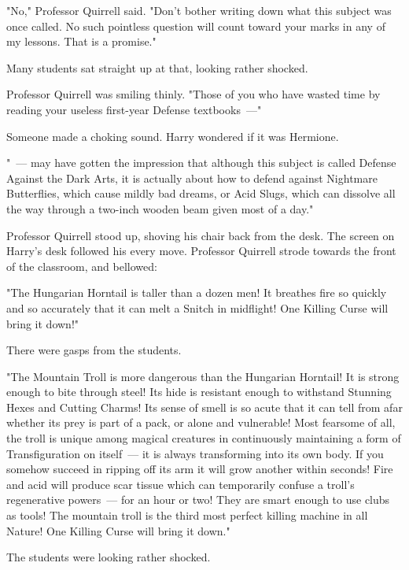"No," Professor Quirrell said. "Don't bother writing down what this subject was
once called. No such pointless question will count toward your marks in any of
my lessons. That is a promise."

Many students sat straight up at that, looking rather shocked.

Professor Quirrell was smiling thinly. "Those of you who have wasted time by
reading your useless first-year Defense textbooks~---"

Someone made a choking sound. Harry wondered if it was Hermione.

"~--- may have gotten the impression that although this subject is called Defense
Against the Dark Arts, it is actually about how to defend against Nightmare
Butterflies, which cause mildly bad dreams, or Acid Slugs, which can dissolve
all the way through a two-inch wooden beam given most of a day."

Professor Quirrell stood up, shoving his chair back from the desk. The screen
on Harry's desk followed his every move. Professor Quirrell strode towards the
front of the classroom, and bellowed:

"The Hungarian Horntail is taller than a dozen men! It breathes fire so quickly
and so accurately that it can melt a Snitch in midflight! One Killing Curse
will bring it down!"

There were gasps from the students.

"The Mountain Troll is more dangerous than the Hungarian Horntail! It is strong
enough to bite through steel! Its hide is resistant enough to withstand
Stunning Hexes and Cutting Charms! Its sense of smell is so acute that it can
tell from afar whether its prey is part of a pack, or alone and vulnerable!
Most fearsome of all, the troll is unique among magical creatures in
continuously maintaining a form of Transfiguration on itself~--- it is always
transforming into its own body. If you somehow succeed in ripping off its arm
it will grow another within seconds! Fire and acid will produce scar tissue
which can temporarily confuse a troll's regenerative powers~--- for an hour or
two! They are smart enough to use clubs as tools! The mountain troll is the
third most perfect killing machine in all Nature! One Killing Curse will bring
it down."

The students were looking rather shocked.

